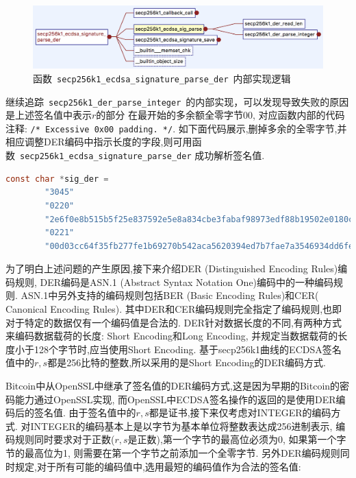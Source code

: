 \documentclass{article}
\newcommand{\code}[1]{\lstinline!#1!}
\begin{document}
\begin{figure}[h]
\centering
\includegraphics[width=\textwidth]{./secp256k1-ecdsa-signature-parse-der.png}
\caption{函数~\code{secp256k1_ecdsa_signature_parse_der}~内部实现逻辑}\label{fig-parsesig}
\end{figure}

继续追踪~\code{secp256k1_der_parse_integer}~的内部实现，可以发现导致失败的原因是上述签名值中表示$r$的部分
在最开始的多余额全零字节$00$, 对应函数内部的代码注释: \code{/* Excessive 0x00 padding. */}.
如下面代码展示,删掉多余的全零字节,并相应调整DER编码中指示长度的字段,则可用函数~\code{secp256k1_ecdsa_signature_parse_der}
成功解析签名值.

\begin{lstlisting}[language=c, caption = 可成功解析的DER编码的ECDSA签名, label=lst-gooddersig]
    const char *sig_der =
        "3045"
        "0220"
        "2e6f0e8b515b5f25e837592e5e8a834cbe3fabaf98973edf88b19502e0180c2d"
        "0221"
        "00d03cc64f35fb277fe1b69270b542aca5620394ed7b7fae7a3546934dd6fe4288";
\end{lstlisting}

为了明白上述问题的产生原因,接下来介绍DER (Distinguished Encoding Rules)编码规则,
DER编码是ASN.1 (Abstract Syntax Notation One)编码中的一种编码规则. 
ASN.1中另外支持的编码规则包括BER (Basic Encoding Rules)和CER( Canonical Encoding Rules).
其中DER和CER编码规则完全指定了编码规则,也即对于特定的数据仅有一个编码值是合法的.
DER针对数据长度的不同,有两种方式来编码数据载荷的长度: Short Encoding和Long Encoding, 
并规定当数据载荷的长度小于128个字节时,应当使用Short Encoding. 
基于secp256k1曲线的ECDSA签名值中的$r, s$都是256比特的整数,所以采用的是Short Encoding的DER编码方式.

Bitcoin中从OpenSSL中继承了签名值的DER编码方式,这是因为早期的Bitcoin的密码能力通过OpenSSL实现,
而OpenSSL中ECDSA签名操作的返回的是使用DER编码后的签名值.
由于签名值中的$r,s$都是证书,接下来仅考虑对INTEGER的编码方式.
对INTEGER的编码基本上是以字节为基本单位将整数表达成256进制表示,
编码规则同时要求对于正数($r,s$是正数),第一个字节的最高位必须为0,
如果第一个字节的最高位为1, 则需要在第一个字节之前添加一个全零字节.
另外DER编码规则同时规定,对于所有可能的编码值中,选用最短的编码值作为合法的签名值:
\end{document}
